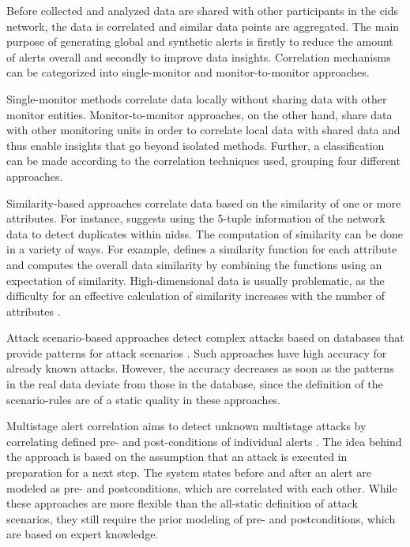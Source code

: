 Before collected and analyzed data are shared with other participants in the \gls{cids} network, the data is correlated and similar data points are aggregated. The main purpose of generating global and synthetic alerts is firstly to reduce the amount of alerts overall and secondly to improve data insights. Correlation mechanisms can be categorized into single-monitor and monitor-to-monitor approaches. 

Single-monitor methods correlate data locally without sharing data with other monitor entities. Monitor-to-monitor approaches, on the other hand, share data with other monitoring units in order to correlate local data with shared data and thus enable insights that go beyond isolated methods. Further, a classification can be made according to the correlation techniques used, grouping four different approaches.

Similarity-based approaches correlate data based on the similarity of one or more attributes. For instance, \cite{goo_2001} suggests using the 5-tuple information of the network data to detect duplicates within \glspl{nids}. The computation of similarity can be done in a variety of ways. For example, \cite{goo_2001b} defines a similarity function for each attribute and computes the overall data similarity by combining the functions using an expectation of similarity. High-dimensional data is usually problematic, as the difficulty for an effective calculation of similarity increases with the number of attributes \cite{zho_2009}.

Attack scenario-based approaches detect complex attacks based on databases that provide patterns for attack scenarios \cite{hut_2004} \cite{jaj_2002}. Such approaches have high accuracy for already known attacks. However, the accuracy decreases as soon as the patterns in the real data deviate from those in the database, since the definition of the scenario-rules are of a static quality in these approaches.

Multistage alert correlation aims to detect unknown multistage attacks by correlating defined pre- and post-conditions of individual alerts \cite{Cuppens2002} \cite{che_2003}. The idea behind the approach is based on the assumption that an attack is executed in preparation for a next step. The system states before and after an alert are modeled as pre- and postconditions, which are correlated with each other. While these approaches are more flexible than the all-static definition of attack scenarios, they still require the prior modeling of pre- and postconditions, which are based on expert knowledge.

